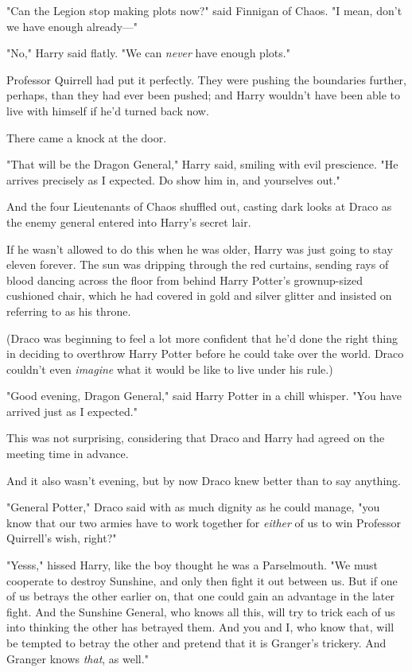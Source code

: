 "Can the Legion stop making plots now?" said Finnigan of Chaos. "I mean, don't 
we have enough already---"

"No," Harry said flatly. "We can \emph{never} have enough plots."

Professor Quirrell had put it perfectly. They were pushing the boundaries 
further, perhaps, than they had ever been pushed; and Harry wouldn't have been 
able to live with himself if he'd turned back now.

There came a knock at the door.

"That will be the Dragon General," Harry said, smiling with evil prescience. 
"He arrives precisely as I expected. Do show him in, and yourselves out."

And the four Lieutenants of Chaos shuffled out, casting dark looks at Draco as 
the enemy general entered into Harry's secret lair.

If he wasn't allowed to do this when he was older, Harry was just going to stay 
eleven forever.
\sbreak
The sun was dripping through the red curtains, sending rays of blood dancing 
across the floor from behind Harry Potter's grownup-sized cushioned chair, 
which he had covered in gold and silver glitter and insisted on referring to as 
his throne.

(Draco was beginning to feel a lot more confident that he'd done the right 
thing in deciding to overthrow Harry Potter before he could take over the 
world. Draco couldn't even \emph{imagine} what it would be like to live under 
his rule.)

"Good evening, Dragon General," said Harry Potter in a chill whisper. "You have 
arrived just as I expected."

This was not surprising, considering that Draco and Harry had agreed on the 
meeting time in advance.

And it also wasn't evening, but by now Draco knew better than to say anything.

"General Potter," Draco said with as much dignity as he could manage, "you know 
that our two armies have to work together for \emph{either} of us to win 
Professor Quirrell's wish, right?"

"Yesss," hissed Harry, like the boy thought he was a Parselmouth. "We must 
cooperate to destroy Sunshine, and only then fight it out between us. But if 
one of us betrays the other earlier on, that one could gain an advantage in the 
later fight. And the Sunshine General, who knows all this, will try to trick 
each of us into thinking the other has betrayed them. And you and I, who know 
that, will be tempted to betray the other and pretend that it is Granger's 
trickery. And Granger knows \emph{that}, as well."

